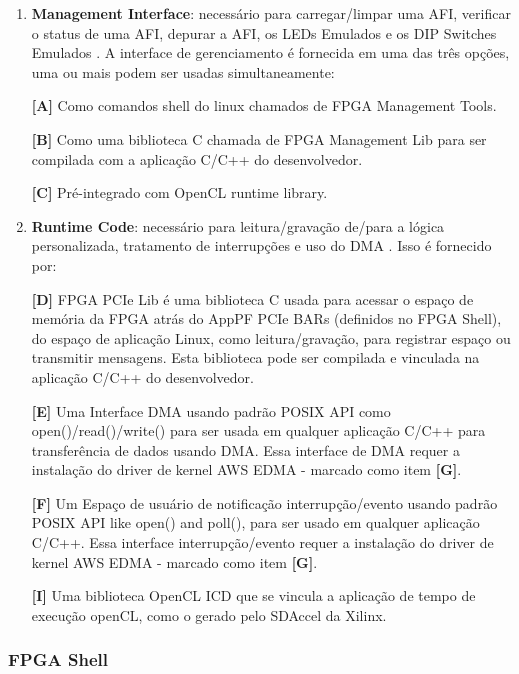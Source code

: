\begin{enumerate}
    \item \textbf{Management Interface}: necessário para carregar/limpar uma AFI, verificar o status de uma AFI, depurar a AFI, os LEDs Emulados e os  DIP Switches Emulados \cite{awscl}. A interface de gerenciamento é fornecida em uma das três opções, uma ou mais podem ser usadas simultaneamente:
    
   \textbf{[A]} Como comandos shell do linux chamados de  FPGA Management Tools. 
    
    \textbf{[B]} Como uma biblioteca C chamada de FPGA Management Lib para ser compilada com a aplicação C/C++ do desenvolvedor.
    
    \textbf{[C]} Pré-integrado com OpenCL runtime library.
    
    \item \textbf{Runtime Code}: necessário para leitura/gravação de/para a lógica personalizada, tratamento de interrupções e uso do DMA \cite{awscl}. Isso é fornecido por:
    
    \textbf{[D]} FPGA PCIe Lib é uma biblioteca C usada para acessar o espaço de memória da FPGA atrás do AppPF PCIe BARs (definidos no FPGA Shell), do espaço de aplicação Linux, como leitura/gravação, para registrar espaço ou transmitir mensagens. Esta biblioteca pode ser compilada e vinculada na aplicação C/C++ do desenvolvedor.
    
    \textbf{[E]} Uma  Interface DMA usando padrão  POSIX API como open()/read()/write() para ser usada em qualquer aplicação C/C++ para transferência de dados usando DMA. Essa interface de DMA requer a instalação do driver de kernel  AWS EDMA - marcado como item \textbf{[G]}.
    
    \textbf{[F]} Um Espaço de usuário de notificação interrupção/evento usando padrão  POSIX API like open() and poll(), para ser usado em qualquer aplicação C/C++. Essa interface interrupção/evento requer a instalação do driver de kernel  AWS EDMA - marcado como item \textbf{[G]}.
    
    \textbf{[I]} Uma biblioteca OpenCL ICD que se vincula a aplicação de tempo de execução openCL, como o gerado pelo SDAccel da Xilinx.
    

\end{enumerate}



\subsubsection{FPGA Shell} \label{sec:shell}

